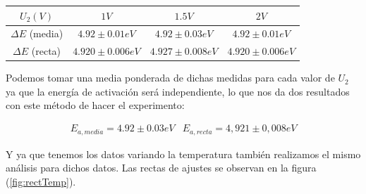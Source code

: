 \documentclass{article}
\begin{document}
\begin{center}
\begin{tabular}{|c|c|c|c|}
\hline
$U_2 (V)$ & $1V$ & $1.5V$ & $2V$ \\ \hline \hline
$\Delta E$ (media) & $4.92 \pm 0.01 eV$ & $4.92 \pm 0.03 eV$ & $4.92 \pm 0.01 eV$ \\
$\Delta E$ (recta) & $4.920 \pm 0.006 eV$ & $4.927 \pm 0.008 eV$ & $4.920 \pm 0.006 eV$ \\ \hline
\end{tabular}
\end{center}

Podemos tomar una media ponderada de dichas medidas para cada valor de $U_2$ ya que la energía de activación será independiente, lo que nos da dos resultados con este método de hacer el experimento:

$$
\begin{array}{cc}
E_{a, media} = 4.92 \pm 0.03 eV & E_{a, recta} = 4,921 \pm 0,008 eV
\end{array}
$$

Y ya que tenemos los datos variando la temperatura también realizamos el mismo análisis para dichos datos. Las rectas de ajustes se observan en la figura (\ref{fig:rectTemp}).
\end{document}
